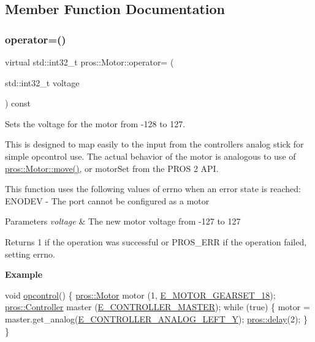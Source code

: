 \subsection{Member Function Documentation}
\mbox{\label{classpros_1_1Motor_a4cf8a9518eb6cd268d27151f0df7fd38}} 
\subsubsection{\texorpdfstring{operator=()}{operator=()}}
{\footnotesize\ttfamily virtual std\+::int32\+\_\+t pros\+::\+Motor\+::operator= (\begin{DoxyParamCaption}\item[{std\+::int32\+\_\+t}]{voltage }\end{DoxyParamCaption}) const\hspace{0.3cm}{\ttfamily [virtual]}}



Sets the voltage for the motor from -\/128 to 127. 

This is designed to map easily to the input from the controller\textquotesingle{}s analog stick for simple opcontrol use. The actual behavior of the motor is analogous to use of \hyperlink{classpros_1_1Motor_a7ea9aedd4e12844be2584dc3f4b7a4bf}{pros\+::\+Motor\+::move()}, or motor\+Set from the P\+R\+OS 2 A\+PI.

This function uses the following values of errno when an error state is reached\+: E\+N\+O\+D\+EV -\/ The port cannot be configured as a motor


\begin{DoxyParams}{Parameters}
{\em voltage} & The new motor voltage from -\/127 to 127\\
\hline
\end{DoxyParams}
\begin{DoxyReturn}{Returns}
1 if the operation was successful or P\+R\+O\+S\+\_\+\+E\+RR if the operation failed, setting errno.
\end{DoxyReturn}
{\bfseries Example} 
\begin{DoxyCode}
\textcolor{keywordtype}{void} \hyperlink{main_8h_a1903abdb5ef0f301d660754c8315fc17}{opcontrol}() \{
  \hyperlink{classpros_1_1Motor}{pros::Motor} motor (1, \hyperlink{motors_8h_a20a5d12701ec52a5c6bde1c3fe14ab92a95444ef9bee438d4bcfebb0c0a399443}{E\_MOTOR\_GEARSET\_18});
  \hyperlink{classpros_1_1Controller}{pros::Controller} master (\hyperlink{misc_8h_af1323f00203099060d46f722b1fbd460a1c9d9311575877d185c44df1cadad226}{E\_CONTROLLER\_MASTER});
  \textcolor{keywordflow}{while} (\textcolor{keyword}{true}) \{
    motor = master.get\_analog(\hyperlink{misc_8h_a8bdd0963e2bc0d4fbe03435eee8a5ca5ac68939b7adc180b25b95367fd0098e99}{E\_CONTROLLER\_ANALOG\_LEFT\_Y});
    \hyperlink{rtos_8h_ab8c5a8048d5576a33d7f79b95a2fa0dd}{pros::delay}(2);
  \}
\}
\end{DoxyCode}
 \mbox{\label{classpros_1_1Motor_a7ea9aedd4e12844be2584dc3f4b7a4bf}} 
